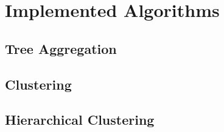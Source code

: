 \section{Implemented Algorithms}


\subsection{Tree Aggregation}


\subsection{Clustering}


\subsection{Hierarchical Clustering}

